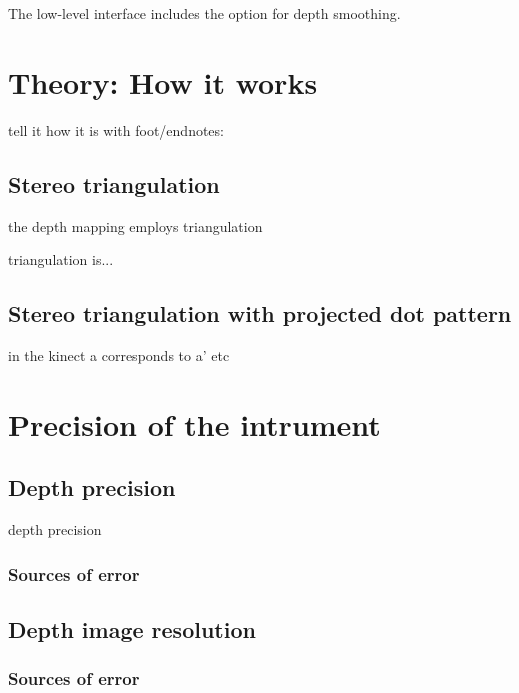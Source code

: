 The low-level interface includes the option for depth smoothing.

\section{Theory: How it works}
\label{howitworks}

tell it how it is with foot/endnotes:

\subsection{Stereo triangulation}

the depth mapping employs triangulation

triangulation is...

\subsection{Stereo triangulation with projected dot pattern}

in the kinect a corresponds to a' etc


\section{Precision of the intrument}
\label{precision}

\subsection{Depth precision}
depth precision

\subsubsection{Sources of error}

\subsection{Depth image resolution}

\subsubsection{Sources of error}
